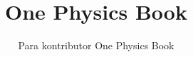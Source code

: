\documentclass[11pt,a4paper,twoside,openany]{book}
\title{One Physics Book}
\author{Para kontributor One Physics Book}
\date{\bookdate}
\begin{document}
\frontmatter



\tableofcontents

\mainmatter





\appendix
\part{\omsolutionspart}




\backmatter
\printindex
\end{document}
